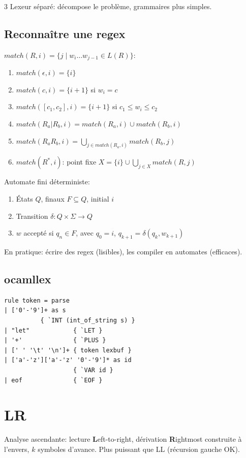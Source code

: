 \documentclass[12pt, a4paper]{article}
\begin{document}
\begin{multicols*}{3}
	Lexeur séparé: décompose le problème, grammaires plus simples.
 
  \colbreak
	\subsection{Reconnaître une regex}
	$match(R,i)=\{j\mid w_i\ldots w_{j-1}\in L(R)\}$:
	\begin{enumerate}[\roman*.]
		\item $match(\epsilon,i)=\{i\}$
		\item $match(c,i)=\{i+1\}$ si $w_i=c$
		\item $match([c_1,c_2],i)=\{i+1\}$ si $c_1\leq w_i\leq c_2$
		\item $match(R_a|R_b,i)=match(R_a,i)\cup match(R_b,i)$
		\item $match(R_aR_b,i)=\bigcup_{j\in match(R_a,i)}match(R_b,j)$
		\item $match(R^*,i)$: point fixe $X=\{i\}\cup\bigcup_{j\in X}match(R,j)$
	\end{enumerate}
 
	Automate fini déterministe:
	\begin{enumerate}[\roman*.]
		\item États $Q$, finaux $F\subseteq Q$, initial $i$
		\item Transition $\delta:Q\times\Sigma\rightarrow Q$
		\item $w$ accepté si $q_n\in F$, avec $q_0=i$, $q_{k+1}=\delta(q_k,w_{k+1})$
	\end{enumerate}
	En pratique: écrire des regex (lisibles), les compiler en automates (efficaces).
 
	\subsection{ocamllex}
	\noindent\begin{minipage}{\linewidth}
		\begin{lstlisting}[style=ocaml]
rule token = parse
| ['0'-'9']+ as s
          { `INT (int_of_string s) }
| "let"            { `LET }
| '+'              { `PLUS }
| [' ' '\t' '\n']+ { token lexbuf }
| ['a'-'z']['a'-'z' '0'-'9']* as id
                   { `VAR id }
| eof              { `EOF }
\end{lstlisting}
	\end{minipage}
 
  \colbreak
	\section{LR}
	Analyse ascendante: lecture \textbf{L}eft-to-right, dérivation \textbf{R}ightmost construite à l'envers, $k$ symboles d'avance. Plus puissant que LL (récursion gauche OK).
 

\end{multicols*}
\end{document}
